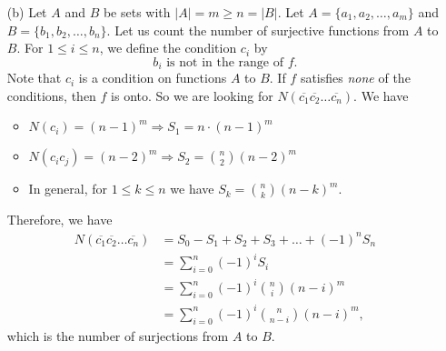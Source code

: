 \documentclass[11pt]{article}
\begin{document}
\begin{enumerate}
        \item[(b)] Let $A$ and $B$ be sets with \(|A| = m \geq n = |B|.\) Let \(A = \{a_1, a_2, \dots, a_m\}\) and \(B = \{b_1, b_2, \dots, b_n\}\). Let us count the number of surjective functions from $A$ to $B$. For \(1 \leq i \leq n\), we define the condition \(c_i\) by \[b_i \text{ is not in the range of } f.\] Note that \(c_i\) is a condition on functions $A$ to $B$. If $f$ satisfies \emph{none} of the conditions, then $f$ is onto. So we are looking for \(N(\overline{c_1} \overline{c_2} \dots \overline{c_n})\). We have 
        \begin{itemize}
            \item \(N(c_i) = (n-1)^m \Rightarrow S_1 = n \cdot (n-1)^m\)
            \item \(N(c_i c_j) = (n-2)^m \Rightarrow S_2 = \binom{n}{2} (n-2)^m\)
            \item In general, for \(1 \leq k \leq n\) we have \(S_k = \binom{n}{k} (n-k)^m.\)
        \end{itemize} 
        Therefore, we have 
        \begin{align*}
            N(\overline{c_1} \overline{c_2} \dots \overline{c_n}) &= S_0 - S_1 + S_2 + S_3 + \dots + (-1)^n S_n \\
            &= \sum_{i=0}^{n} (-1)^i S_i \\
            &= \sum_{i=0}^{n} (-1)^i \binom{n}{i} (n-i)^m \\
            &= \sum_{i=0}^{n} (-1)^i \binom{n}{n-i} (n-i)^m,
        \end{align*}
        which is the number of surjections from $A$ to $B$. 


\end{enumerate}
\end{document}
